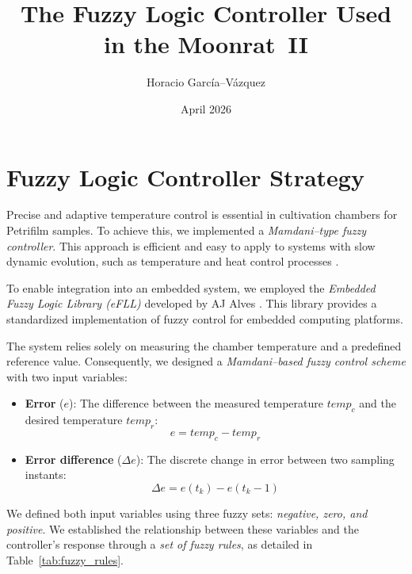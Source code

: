 \documentclass{article}
\title{The Fuzzy Logic Controller Used in the Moonrat~II}
\author{Horacio García--Vázquez}
\date{April 2026}
\begin{document}
\maketitle

\section{Fuzzy Logic Controller Strategy}

Precise and adaptive temperature control is essential in cultivation chambers for Petrifilm samples. To achieve this, we implemented a \textit{Mamdani--type fuzzy controller}. This approach is efficient and easy to apply to systems with slow dynamic evolution, such as temperature and heat control processes \cite{Sherif2014,Vijayalakshmi2017,Izquierdo2018,Coban2019,Sakaci2021}. 

To enable integration into an embedded system, we employed the \textit{Embedded Fuzzy Logic Library (eFLL)} developed by AJ Alves \cite{eFLL}. This library provides a standardized implementation of fuzzy control for embedded computing platforms.  

The system relies solely on measuring the chamber temperature and a predefined reference value. Consequently, we designed a \textit{Mamdani--based fuzzy control scheme} with two input variables:
\begin{itemize}
\item \textbf{Error} ($e$): The difference between the measured temperature $temp_c$ and the desired temperature $temp_r$:
\begin{equation}
e = temp_c - temp_r
\end{equation}

\item \textbf{Error difference} ($\Delta e$): The discrete change in error between two sampling instants:
\begin{equation}
\Delta e = e(t_k) - e(t_k - 1)
\end{equation}
\end{itemize}

We defined both input variables using three fuzzy sets: \textit{negative, zero, and positive}. We established the relationship between these variables and the controller’s response through a \textit{set of fuzzy rules}, as detailed in Table~\ref{tab:fuzzy_rules}.  
\end{document}
